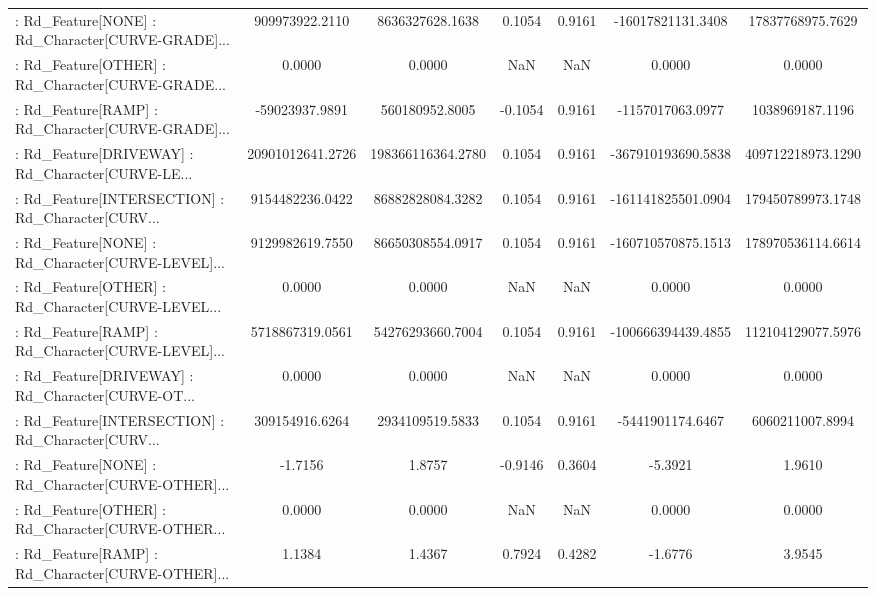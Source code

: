 \begin{longtable}{p{4cm}cccccc}
 : Rd\_Feature[NONE] : Rd\_Character[CURVE-GRADE]... &    909973922.2110 &   8636327628.1638 &  0.1054 &       0.9161 &  -16017821131.3408 &  17837768975.7629 \\
 : Rd\_Feature[OTHER] : Rd\_Character[CURVE-GRADE... &            0.0000 &            0.0000 &     NaN &          NaN &             0.0000 &            0.0000 \\
 : Rd\_Feature[RAMP] : Rd\_Character[CURVE-GRADE]... &    -59023937.9891 &    560180952.8005 & -0.1054 &       0.9161 &   -1157017063.0977 &   1038969187.1196 \\
 : Rd\_Feature[DRIVEWAY] : Rd\_Character[CURVE-LE... &  20901012641.2726 & 198366116364.2780 &  0.1054 &       0.9161 & -367910193690.5838 & 409712218973.1290 \\
 : Rd\_Feature[INTERSECTION] : Rd\_Character[CURV... &   9154482236.0422 &  86882828084.3282 &  0.1054 &       0.9161 & -161141825501.0904 & 179450789973.1748 \\
 : Rd\_Feature[NONE] : Rd\_Character[CURVE-LEVEL]... &   9129982619.7550 &  86650308554.0917 &  0.1054 &       0.9161 & -160710570875.1513 & 178970536114.6614 \\
 : Rd\_Feature[OTHER] : Rd\_Character[CURVE-LEVEL... &            0.0000 &            0.0000 &     NaN &          NaN &             0.0000 &            0.0000 \\
 : Rd\_Feature[RAMP] : Rd\_Character[CURVE-LEVEL]... &   5718867319.0561 &  54276293660.7004 &  0.1054 &       0.9161 & -100666394439.4855 & 112104129077.5976 \\
 : Rd\_Feature[DRIVEWAY] : Rd\_Character[CURVE-OT... &            0.0000 &            0.0000 &     NaN &          NaN &             0.0000 &            0.0000 \\
 : Rd\_Feature[INTERSECTION] : Rd\_Character[CURV... &    309154916.6264 &   2934109519.5833 &  0.1054 &       0.9161 &   -5441901174.6467 &   6060211007.8994 \\
 : Rd\_Feature[NONE] : Rd\_Character[CURVE-OTHER]... &           -1.7156 &            1.8757 & -0.9146 &       0.3604 &            -5.3921 &            1.9610 \\
 : Rd\_Feature[OTHER] : Rd\_Character[CURVE-OTHER... &            0.0000 &            0.0000 &     NaN &          NaN &             0.0000 &            0.0000 \\
 : Rd\_Feature[RAMP] : Rd\_Character[CURVE-OTHER]... &            1.1384 &            1.4367 &  0.7924 &       0.4282 &            -1.6776 &            3.9545 \\

\end{longtable}
